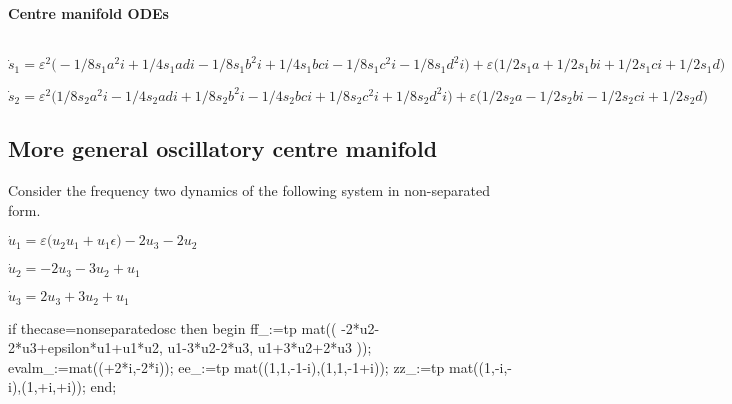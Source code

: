 \documentclass[11pt,a5paper]{article}
\begin{document}
\paragraph{Centre manifold ODEs}
\begin{math}
\end{math}\par

\begin{math}
\dot s_{1}=\varepsilon ^{2} \big(-1/8 s_{1} a^{2} i+1/4 s_{1} a d i-1/8 
s_{1} b^{2} i+1/4 s_{1} b c i-1/8 s_{1} c^{2} i-1/8 s_{1} d^{2} i\big)+
\varepsilon  \big(1/2 s_{1} a+1/2 s_{1} b i+1/2 s_{1} c i+1/2 s_{1} d
\big)
\end{math}\par

\begin{math}
\dot s_{2}=\varepsilon ^{2} \big(1/8 s_{2} a^{2} i-1/4 s_{2} a d i+1/8 s
_{2} b^{2} i-1/4 s_{2} b c i+1/8 s_{2} c^{2} i+1/8 s_{2} d^{2} i\big)+
\varepsilon  \big(1/2 s_{2} a-1/2 s_{2} b i-1/2 s_{2} c i+1/2 s_{2} d
\big)
\end{math}





\subsection{More general oscillatory centre manifold}
Consider the frequency two dynamics of the following system in  non-separated form.

\begin{math}
\dot u_{1}=\varepsilon  \big(u_{2} u_{1}+u_{1} \epsilon \big)-2 u_{3}-2 
u_{2}
\end{math}\par

\begin{math}
\dot u_{2}=-2 u_{3}-3 u_{2}+u_{1}
\end{math}\par

\begin{math}
\dot u_{3}=2 u_{3}+3 u_{2}+u_{1}
\end{math}

\begin{reduce}
if thecase=nonseparatedosc then begin
ff_:=tp mat((
    -2*u2-2*u3+epsilon*u1+u1*u2,
    u1-3*u2-2*u3,
    u1+3*u2+2*u3
    ));
evalm_:=mat((+2*i,-2*i));
ee_:=tp mat((1,1,-1-i),(1,1,-1+i));
zz_:=tp mat((1,-i,-i),(1,+i,+i));
end;
\end{reduce}
\end{document}

